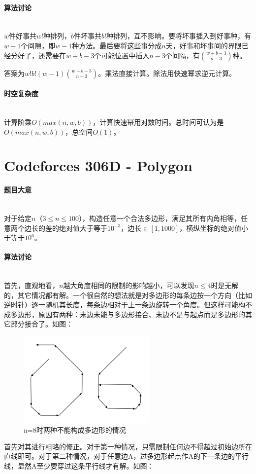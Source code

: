 \documentclass[UTF8]{ctexart}
\newcommand{\myparagraph}[1]{\paragraph{#1}\mbox{}\\}
\theoremstyle{nonumberplain}
\begin{document}
		\myparagraph{算法讨论}
		
			$w$件好事共$w!$种排列，$b$件坏事共$b!$种排列，互不影响。要将坏事插入到好事种，有$w-1$个间隙，即$w-1$种方法。最后要将这些事分成$n$天，好事和坏事间的界限已经分好了，还需要在$w+b-3$个可能位置中插入$n-3$个间隔，有$\binom{w+b-3}{n-3}$种。
			
			答案为$w!b!(w-1)\binom{w+b-3}{n-3}$。乘法直接计算。除法用快速幂求逆元计算。
		
		\myparagraph{时空复杂度}
		
			计算阶乘$O(max(n,w,b))$，计算快速幂用对数时间。总时间可认为是$O(max(n,w,b))$，总空间$O(1)$。
	
	\section{Codeforces 306D - Polygon}
	
		\myparagraph{题目大意}
		
			对于给定$n$（$3 \leq n \leq 100$），构造任意一个合法多边形，满足其所有内角相等，任意两个边长的差的绝对值大于等于$10^{-3}$，边长$\in [1,1000]$，横纵坐标的绝对值小于等于$10^6$。
		
		\myparagraph{算法讨论}
		
			首先，直观地看，$n$越大角度相同的限制的影响越小，可以发现$n \leq 4$时是无解的，其它情况都有解。一个很自然的想法就是对多边形的每条边按一个方向（比如逆时针）逐一随机其长度，每条边相对于上一条边旋转一个角度。但这样可能构不成多边形，原因有两种：末边未能与多边形接合、末边不是与起点而是多边形的其它部分接合了。如图：
			
			\begin{figure}[ht]
				\centering
				\includegraphics[width=0.6\textwidth]{fig306d_1.png}
				\caption{n=8时两种不能构成多边形的情况}
			\end{figure}
			
			首先对其进行粗略的修正。对于第一种情况，只需限制任何边不得超过初始边所在直线即可。对于第二种情况，对于任意边A，过多边形起点作A的下一条边的平行线，显然A至少要穿过这条平行线才有解。如图：
			
\end{document}
